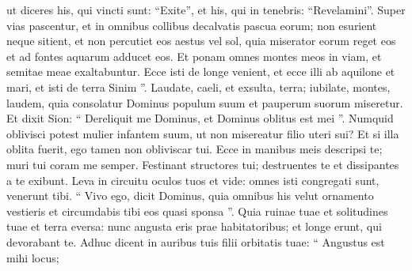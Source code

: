 \begin{biblechapter}
\begin{biblechapter}
\begin{biblechapter}
\begin{biblechapter}
\begin{biblechapter}
\begin{biblechapter}
\begin{biblechapter}
\begin{biblechapter}
\begin{biblechapter}
\begin{biblechapter}
\begin{biblechapter}
\begin{biblechapter}
\begin{biblechapter}
\begin{biblechapter}
\begin{biblechapter}
\begin{biblechapter}
\begin{biblechapter}
\begin{biblechapter}
\begin{biblechapter}
\begin{biblechapter}
\begin{biblechapter}
\begin{biblechapter}
\begin{biblechapter}
\begin{biblechapter}
\begin{biblechapter}
\begin{biblechapter}
\begin{biblechapter}
\begin{biblechapter}
\begin{biblechapter}
\begin{biblechapter}
\begin{biblechapter}
\begin{biblechapter}
\begin{biblechapter}
\begin{biblechapter}
\begin{biblechapter}
\begin{biblechapter}
\begin{biblechapter}
\begin{biblechapter}
\begin{biblechapter}
\begin{biblechapter}
\begin{biblechapter}
\begin{biblechapter}
\begin{biblechapter}
\begin{biblechapter}
\begin{biblechapter}
\begin{biblechapter}
\begin{biblechapter}
\begin{biblechapter}
\begin{biblechapter}
 \verse ut diceres his, qui vincti sunt: “Exite”,
 et his, qui in tenebris: “Revelamini”.
 Super vias pascentur,
 et in omnibus collibus decalvatis pascua eorum;
 \verse non esurient neque sitient,
 et non percutiet eos aestus vel sol,
 quia miserator eorum reget eos
 et ad fontes aquarum adducet eos.
 \verse Et ponam omnes montes meos in viam,
 et semitae meae exaltabuntur.
 \verse Ecce isti de longe venient,
 et ecce illi ab aquilone et mari,
 et isti de terra Sinim ”.
 \verse Laudate, caeli, et exsulta, terra;
 iubilate, montes, laudem,
 quia consolatur Dominus populum suum
 et pauperum suorum miseretur.
 \verse Et dixit Sion: “ Dereliquit me Dominus,
 et Dominus oblitus est mei ”.
 \verse Numquid oblivisci potest mulier infantem suum,
 ut non misereatur filio uteri sui?
 Et si illa oblita fuerit,
 ego tamen non obliviscar tui.
 \verse Ecce in manibus meis descripsi te;
 muri tui coram me semper.
 \verse Festinant structores tui;
 destruentes te et dissipantes a te exibunt.
 \verse Leva in circuitu oculos tuos et vide:
 omnes isti congregati sunt, venerunt tibi.
 “ Vivo ego, dicit Dominus,
 quia omnibus his velut ornamento vestieris
 et circumdabis tibi eos quasi sponsa ”.
 \verse Quia ruinae tuae et solitudines tuae
 et terra eversa:
 nunc angusta eris prae habitatoribus;
 et longe erunt, qui devorabant te.
 \verse Adhuc dicent in auribus tuis
 filii orbitatis tuae:
 “ Angustus est mihi locus;

\end{biblechapter}
\end{biblechapter}
\end{biblechapter}
\end{biblechapter}
\end{biblechapter}
\end{biblechapter}
\end{biblechapter}
\end{biblechapter}
\end{biblechapter}
\end{biblechapter}
\end{biblechapter}
\end{biblechapter}
\end{biblechapter}
\end{biblechapter}
\end{biblechapter}
\end{biblechapter}
\end{biblechapter}
\end{biblechapter}
\end{biblechapter}
\end{biblechapter}
\end{biblechapter}
\end{biblechapter}
\end{biblechapter}
\end{biblechapter}
\end{biblechapter}
\end{biblechapter}
\end{biblechapter}
\end{biblechapter}
\end{biblechapter}
\end{biblechapter}
\end{biblechapter}
\end{biblechapter}
\end{biblechapter}
\end{biblechapter}
\end{biblechapter}
\end{biblechapter}
\end{biblechapter}
\end{biblechapter}
\end{biblechapter}
\end{biblechapter}
\end{biblechapter}
\end{biblechapter}
\end{biblechapter}
\end{biblechapter}
\end{biblechapter}
\end{biblechapter}
\end{biblechapter}
\end{biblechapter}
\end{biblechapter}
